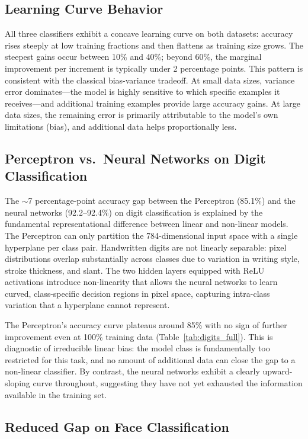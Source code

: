 \documentclass[12pt]{article}
\begin{document}
\subsection{Learning Curve Behavior}

All three classifiers exhibit a concave learning curve on both datasets: accuracy rises
steeply at low training fractions and then flattens as training size grows. The steepest
gains occur between 10\% and 40\%; beyond 60\%, the marginal improvement per increment
is typically under 2 percentage points. This pattern is consistent with the classical
bias-variance tradeoff. At small data sizes, variance error dominates---the model is
highly sensitive to which specific examples it receives---and additional training examples
provide large accuracy gains. At large data sizes, the remaining error is primarily
attributable to the model's own limitations (bias), and additional data helps
proportionally less.

\subsection{Perceptron vs.\ Neural Networks on Digit Classification}

The $\sim$7 percentage-point accuracy gap between the Perceptron (85.1\%) and the neural
networks (92.2--92.4\%) on digit classification is explained by the fundamental
representational difference between linear and non-linear models. The Perceptron can only
partition the 784-dimensional input space with a single hyperplane per class pair.
Handwritten digits are not linearly separable: pixel distributions overlap substantially
across classes due to variation in writing style, stroke thickness, and slant. The two
hidden layers equipped with ReLU activations introduce non-linearity that allows the
neural networks to learn curved, class-specific decision regions in pixel space, capturing
intra-class variation that a hyperplane cannot represent.

The Perceptron's accuracy curve plateaus around 85\% with no sign of further improvement
even at 100\% training data (Table~\ref{tab:digits_full}). This is diagnostic of
irreducible linear bias: the model class is fundamentally too restricted for this task,
and no amount of additional data can close the gap to a non-linear classifier. By
contrast, the neural networks exhibit a clearly upward-sloping curve throughout,
suggesting they have not yet exhausted the information available in the training set.

\subsection{Reduced Gap on Face Classification}
\end{document}
